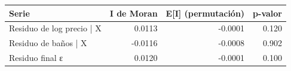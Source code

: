 \begin{tabular}{lrrr}
\toprule
Serie & I de Moran & E[I] (permutación) & p-valor \\
\midrule
Residuo de log precio | X & 0.0113 & -0.0001 & 0.120 \\
Residuo de baños | X & -0.0116 & -0.0008 & 0.902 \\
Residuo final ε & 0.0120 & -0.0001 & 0.100 \\
\bottomrule
\end{tabular}